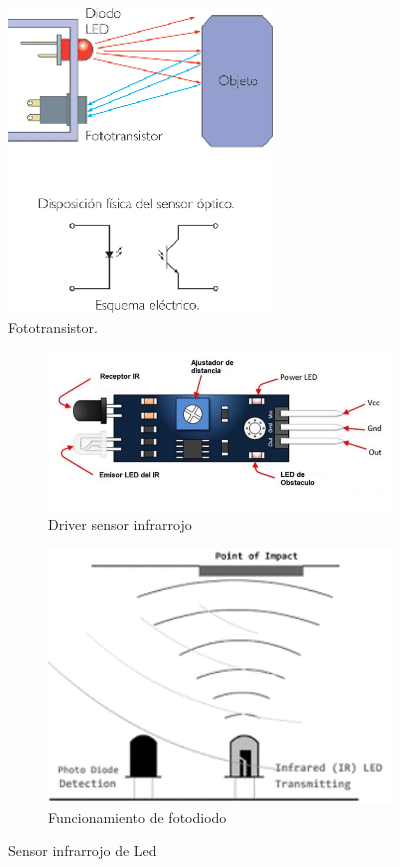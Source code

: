 \documentclass[a4paper,11pt]{report}    %
\begin{document}
\begin{figure}[H]
    \centering
    \includegraphics[width=0.3\linewidth]{img/image6.png}
    \caption{Fototransistor.}
    \label{fig:transistor-corte}
\end{figure}


\begin{figure}[H]
    \begin{subfigure}[t]{0.475\textwidth}
        \includegraphics[width=1\textwidth]{img/image7.png}
        \caption{Driver sensor infrarrojo}
        \label{subfig:example-image-b}
    \end{subfigure}%
    \hfill
    \begin{subfigure}[t]{0.475\textwidth}
        \includegraphics[width=1\textwidth]{img/image8.png}
        \caption{Funcionamiento de fotodiodo}
        \label{subfig:example-image-c}
    \end{subfigure}
    \caption{Sensor infrarrojo de Led}
    \label{fig:test_subfigure}
\end{figure}
\end{document}
